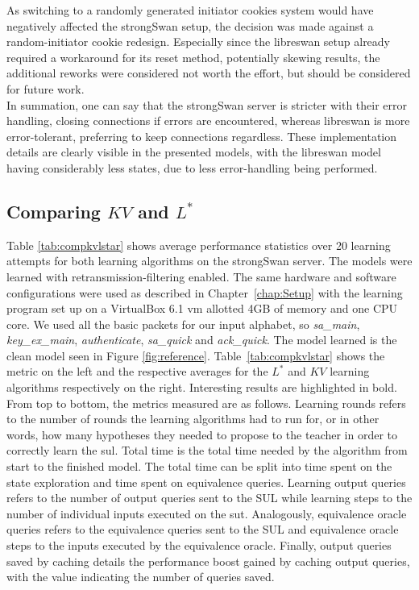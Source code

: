 As switching to a randomly generated initiator cookies system would have negatively affected the strongSwan setup, the decision was made against a random-initiator cookie redesign. Especially since the libreswan setup already required a workaround for its reset method, potentially skewing results, the additional reworks were considered not worth the effort, but should be considered for future work.\\

In summation, one can say that the strongSwan server is stricter with their error handling, closing connections if errors are encountered, whereas libreswan is more error-tolerant, preferring to keep connections regardless. These implementation details are clearly visible in the presented models, with the libreswan model having considerably less states, due to less error-handling being performed.
\newpage

\subsection{Comparing $KV$ and $L^*$} \label{subsec:comp_kv_lstar}
Table \ref{tab:compkvlstar} shows average performance statistics over 20 learning attempts for both learning algorithms on the strongSwan server. The models were learned with retransmission-filtering enabled. The same hardware and software configurations were used as described in Chapter~\ref{chap:Setup} with the learning program set up on a VirtualBox 6.1 \ac{vm} allotted 4GB of memory and one CPU core. We used all the basic packets for our input alphabet, so
\emph{sa\_main}, \emph{key\_ex\_main}, \emph{authenticate}, \emph{sa\_quick} and \emph{ack\_quick}. The model learned is the clean model seen in Figure \ref{fig:reference}. Table~\ref{tab:compkvlstar} shows the metric on the left and the respective averages for the $L^*$ and $KV$ learning algorithms respectively on the right. Interesting results are highlighted in bold. From top to bottom, the metrics measured are as follows. Learning rounds refers to the number of rounds the learning algorithms had to run for, or in other words, how many hypotheses they needed to propose to the teacher in order to correctly learn the \ac{sul}. Total time is the total time needed by the algorithm from start to the finished model. The total time can be split into time spent on the state exploration and time spent on equivalence queries. Learning output queries refers to the number of output queries sent to the SUL while learning steps to the number of individual inputs executed on the \ac{sut}. Analogously, equivalence oracle queries refers to the equivalence queries sent to the SUL and equivalence oracle steps to the inputs executed by the equivalence oracle. Finally, output queries saved by caching details the performance boost gained by caching output queries, with the value indicating the number of queries saved.

